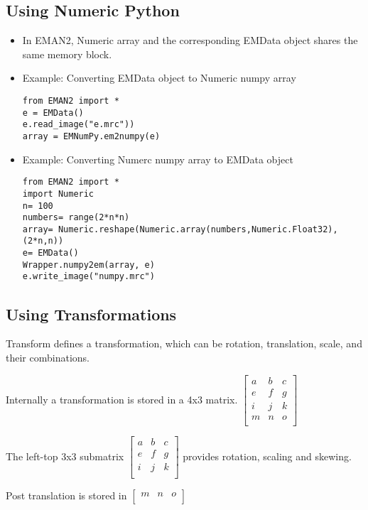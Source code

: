     \subsection{Using Numeric Python} 
    \begin{itemize}
      \item
	In EMAN2,  Numeric array and the corresponding EMData object shares the same memory block.
      \item
	Example: Converting EMData object to Numeric numpy array
	{
	\begin {verbatim}from EMAN2 import *
e = EMData()
e.read_image("e.mrc"))
array = EMNumPy.em2numpy(e)\end{verbatim}}
      \item
	Example: Converting Numerc numpy array to EMData object
	{
	\begin{verbatim}from EMAN2 import *
import Numeric
n= 100
numbers= range(2*n*n)
array= Numeric.reshape(Numeric.array(numbers,Numeric.Float32),(2*n,n))
e= EMData()
Wrapper.numpy2em(array, e)
e.write_image("numpy.mrc")\end{verbatim}}
    \end{itemize}

    \subsection{Using Transformations} 
    Transform defines a transformation, which can be rotation,
    translation, scale, and their combinations.
    
    Internally a transformation is stored in a 4x3 matrix.
    \( \left[ \begin{array}{ccc}
        a&b&c\\
        e&f&g\\
        i&j&k\\
         m&n&o\\
      \end{array} \right] \)
    
    The left-top 3x3 submatrix
    \(\left[ \begin{array}{ccc}
        a& b& c\\
         e& f& g\\
         i& j& k\\
      \end{array} \right] \) 
    provides rotation, scaling and skewing.
    
    Post translation is stored in 
      \( \left[ \begin{array}{ccc}
	  m&n&o\\
	\end{array} \right] \)
      

